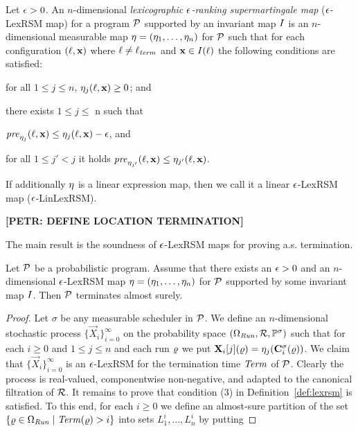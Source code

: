 \begin{definition}
Let $\epsilon>0$. An $n$-dimensional \emph{lexicographic $\epsilon$-ranking supermartingale map} ($\epsilon$-LexRSM map) for a program $\mathcal{P}$ supported by an invariant map $I$ is an $n$-dimensional measurable map $\mathbf{\eta}=(\eta_1,\dots,\eta_n)$ for $\mathcal{P}$ such that for each configuration $(\ell,\mathbf{x})$ where $\ell\neq \ell_{\mathit{term}}$ and $\mathbf{x}\in I(\ell)$ the following conditions are satisfied:
 \begin{compactitem}
 	\item
 	for all $1\leq j \leq n$, $\eta_j(\ell,\mathbf{x})\geq 0$; and
 	\item 
 	there exists $1\leq j \leq$ n such that
 	\begin{compactitem}
 	\item
 	$\mathit{pre}_{\eta_j}(\ell,\mathbf{x}) \leq \eta_j(\ell,\mathbf{x})-\epsilon$, and
 	\item
 	for all $1\leq j'<j$ it holds 
 	$\mathit{pre}_{\eta_{j'}}(\ell,\mathbf{x}) \leq \eta_{j'}(\ell,\mathbf{x})$.
 	\end{compactitem}
 \end{compactitem}
If additionally $\eta$ is a linear expression map, then we call it a linear $\epsilon$-LexRSM map ($\epsilon$-LinLexRSM).
\end{definition}

\textbf{[PETR: DEFINE LOCATION TERMINATION]}

The main result is the soundness of $\epsilon$-LexRSM maps for proving a.s. 
termination.

\begin{theorem}
\label{thm:lexrsm-programs}
Let $\mathcal{P}$ be a probabilistic program. Assume that there exists an $\epsilon>0$ 
and an $n$-dimensional $\epsilon$-LexRSM map $\mathbf{\eta}=(\eta_1,\dots,\eta_n)$ for 
$\mathcal{P}$ supported 
by some 
invariant map $I$. 
Then $\mathcal{P}$ terminates almost surely.
\end{theorem}
\begin{proof}
Let $\sigma$ be any measurable scheduler in $\mathcal{P}$.
We define an $n$-dimensional stochastic process 
$\{\vec{X}_{i}\}_{i=0}^{\infty} $ on the probability space 
$(\Omega_{\mathit{Run}},\mathcal{R},\mathbb{P}^{\sigma})$ such 
that for each 
$i\geq 0$ and $1\leq j 
\leq n$ and each run $\varrho$ we put $\mathbf{X}_{i}[j](\varrho) = 
\eta_j(\mathbf{C}^{\sigma}_{i}(\varrho))$. We claim that $\{\vec{X}_{i}\}_{i=0}^{\infty}$ 
is an $\epsilon$-LexRSM for the termination time $\mathit{Term}$ of $\mathcal{P}$. Clearly 
the process is real-valued, componentwise non-negative, and adapted to the 
canonical filtration of $\mathcal{R}$. It remains to prove that condition (3) in 
Definition~\ref{def:lexrsm} is satisfied. To this end, for each $i\geq 0$ we 
define an almost-sure partition of the set $\{\varrho\in \Omega_{\mathit{Run}}\mid 
\mathit{Term}(\varrho) >i\}$ into sets $L^{i}_1,\dots,L^{i}_n$ by putting 
\end{proof}



